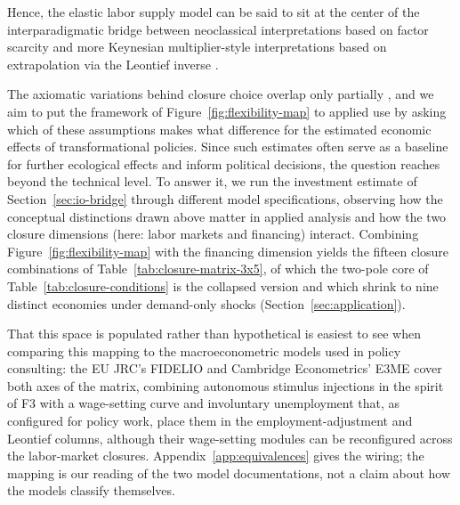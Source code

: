 Hence, the elastic labor supply model can be said to sit at the center of the interparadigmatic bridge between neoclassical interpretations based on factor scarcity and more Keynesian multiplier-style interpretations based on extrapolation via the Leontief inverse \citep{Robinson.2006, Taylor1990}.



 
The axiomatic variations behind closure choice overlap only partially \citep{Kapeller.2013}, and we aim to put the framework of Figure~\ref{fig:flexibility-map} to applied use by asking which of these assumptions makes what difference for the estimated economic effects of transformational policies. Since such estimates often serve as a baseline for further ecological effects and inform political decisions, the question reaches beyond the technical level. To answer it, we run the investment estimate of Section~\ref{sec:io-bridge} through different model specifications, observing how the conceptual distinctions drawn above matter in applied analysis and how the two closure dimensions (here: labor markets and financing) interact. Combining Figure~\ref{fig:flexibility-map} with the financing dimension yields the fifteen closure combinations of Table~\ref{tab:closure-matrix-3x5}, of which the two-pole core of Table~\ref{tab:closure-conditions} is the collapsed version and which shrink to nine distinct economies under demand-only shocks (Section~\ref{sec:application}).



 That this space is populated rather than hypothetical is easiest to see when comparing this mapping to the macroeconometric models used in policy consulting: the EU JRC's FIDELIO \citep{Rocchi.2019, Rocchi.2025} and Cambridge Econometrics' E3ME \citep{E3ME.2022} cover both axes of the matrix, combining autonomous stimulus injections in the spirit of F3 with a wage-setting curve and involuntary unemployment that, as configured for policy work, place them in the employment-adjustment and Leontief columns, although their wage-setting modules can be reconfigured across the labor-market closures. Appendix~\ref{app:equivalences} gives the wiring; the mapping is our reading of the two model documentations, not a claim about how the models classify themselves.
